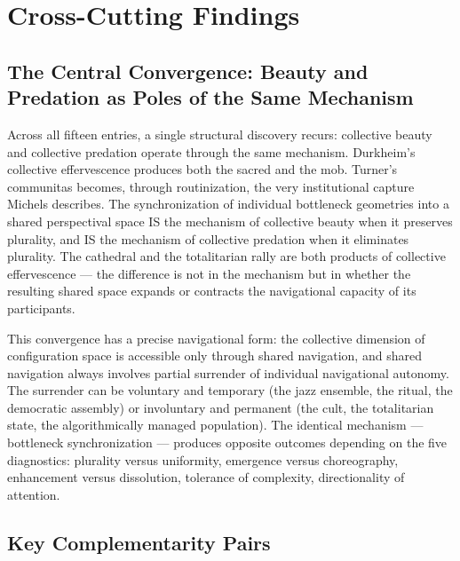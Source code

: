 \bigskip\noindent\makebox[\textwidth]{\color{rulegray}\rule{5cm}{0.3pt}}\bigskip


\section*{Cross-Cutting Findings}


\subsection*{The Central Convergence: Beauty and Predation as Poles of the Same Mechanism}


Across all fifteen entries, a single structural discovery recurs: collective beauty and collective predation operate through the same mechanism. Durkheim's collective effervescence produces both the sacred and the mob. Turner's communitas becomes, through routinization, the very institutional capture Michels describes. The synchronization of individual bottleneck geometries into a shared perspectival space IS the mechanism of collective beauty when it preserves plurality, and IS the mechanism of collective predation when it eliminates plurality. The cathedral and the totalitarian rally are both products of collective effervescence — the difference is not in the mechanism but in whether the resulting shared space expands or contracts the navigational capacity of its participants.


This convergence has a precise navigational form: the collective dimension of configuration space is accessible only through shared navigation, and shared navigation always involves partial surrender of individual navigational autonomy. The surrender can be voluntary and temporary (the jazz ensemble, the ritual, the democratic assembly) or involuntary and permanent (the cult, the totalitarian state, the algorithmically managed population). The identical mechanism — bottleneck synchronization — produces opposite outcomes depending on the five diagnostics: plurality versus uniformity, emergence versus choreography, enhancement versus dissolution, tolerance of complexity, directionality of attention.


\subsection*{Key Complementarity Pairs}



